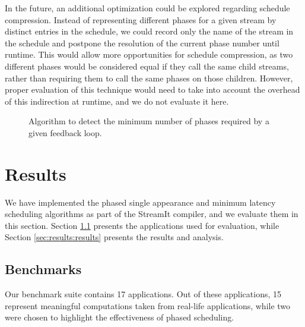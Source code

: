 \documentclass{sig-alt-full}
\begin{document}

In the future, an additional optimization could be explored regarding
schedule compression.  Instead of representing different phases for a
given stream by distinct entries in the schedule, we could record only
the name of the stream in the schedule and postpone the resolution of
the current phase number until runtime.  This would allow more
opportunities for schedule compression, as two different phases would
be considered equal if they call the same child streams, rather than
requiring them to call the same phases on those children.  However,
proper evaluation of this technique would need to take into account
the overhead of this indirection at runtime, and we do not evaluate it
here.

\begin{figure}
\vspace{-16pt}
\caption{\small Algorithm to detect the minimum number of phases required by
a given feedback loop.\protect\label{fig:feedalg}}
\end{figure}

%
%
%
\section{Results}
\label{chpt:results}

We have implemented the phased single appearance and minimum latency
scheduling algorithms as part of the StreamIt compiler, and we
evaluate them in this section.  Section \ref{sec:results:apps}
presents the applications used for evaluation, while Section
\ref{sec:results:results} presents the results and analysis.

\subsection{Benchmarks}
\label{sec:results:apps}

Our benchmark suite contains 17 applications. Out of these
applications, 15 represent meaningful computations taken from
real-life applications, while two were chosen to highlight the
effectiveness of phased scheduling.
\end{document}
